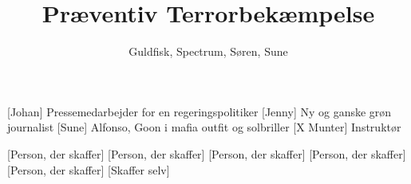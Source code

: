 \documentclass[a4paper,11pt]{article}
\title{Præventiv Terrorbekæmpelse}
\author{Guldfisk, Spectrum, Søren, Sune}
\begin{document}
\maketitle

\begin{roles}
[Johan] Pressemedarbejder for en regeringspolitiker
[Jenny] Ny og ganske grøn journalist
[Sune] Alfonso, Goon i mafia outfit og solbriller
[X Munter] Instruktør
\end{roles}

\begin{props}
[Person, der skaffer]
[Person, der skaffer]
[Person, der skaffer]
[Person, der skaffer]
[Person, der skaffer]
[Skaffer selv]
\end{props}
\end{document}
